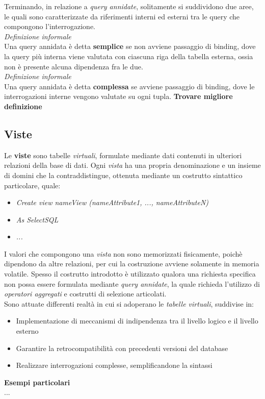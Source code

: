 \documentclass{article}
\begin{document}
Terminando, in relazione a \textit{query annidate}, solitamente si suddividono due aree, le quali sono caratterizzate da riferimenti interni ed esterni tra le query che compongono l'interrogazione.\vspace*{14pt}\\
\textit{Definizione informale}\\
Una query annidata è detta \textbf{semplice} se non avviene passaggio di binding, dove la query più interna viene valutata con ciascuna riga della tabella esterna, ossia non è presente alcuna dipendenza fra le due.\vspace*{14pt}\\
\textit{Definizione informale}\\
Una query annidata è detta \textbf{complessa} se avviene passaggio di binding, dove le interrogazioni interne vengono valutate su ogni tupla. \textbf{Trovare migliore definizione}

\subsection*{Viste}
\large
Le \textbf{viste} sono tabelle \textit{virtuali}, formulate mediante dati contenuti in ulteriori relazioni della base di dati. Ogni \textit{vista} ha una propria denominazione e un insieme di domini che la contraddistingue, ottenuta mediante un costrutto sintattico particolare, quale:
\begin{itemize}[label={ }, leftmargin=1cm]
    \itemsep0em
    \item \textit{Create view nameView (nameAttribute1, ..., nameAttributeN)}
    \item \textit{As SelectSQL} 
    \item \textit{...} 
\end{itemize}
I valori che compongono una \textit{vista} non sono memorizzati fisicamente, poichè dipendono da altre relazioni, per cui la costruzione avviene solamente in memoria volatile. Spesso il costrutto introdotto è utilizzato qualora una richiesta specifica non possa essere formulata mediante \textit{query annidate}, la quale richieda l'utilizzo di \textit{operatori aggregati} e costrutti di selezione articolati.\vspace*{14pt}\\
Sono attuate differenti realtà in cui si adoperano le \textit{tabelle virtuali}, suddivise in:
\begin{itemize}[label={-}]
    \itemsep0em
    \item Implementazione di meccanismi di indipendenza tra il livello logico e il livello esterno
    \item Garantire la retrocompatibilità con precedenti versioni del database
    \item Realizzare interrogazioni complesse, semplificandone la sintassi
\end{itemize}
\textbf{Esempi particolari}\\
...
\end{document}
